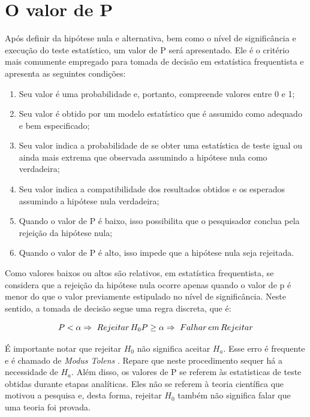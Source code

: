 \documentclass[
]{book}
\providecommand{\tightlist}{%
  \setlength{\itemsep}{0pt}\setlength{\parskip}{0pt}}
\begin{document}
\hypertarget{o-valor-de-p}{%
\section{O valor de P}\label{o-valor-de-p}}

Após definir da hipótese nula e alternativa, bem como o nível de significância e execução do teste estatístico, um valor de P será apresentado. Ele é o critério mais comumente empregado para tomada de decisão em estatística frequentista e apresenta as seguintes condições:

\begin{enumerate}
\def\labelenumi{(\arabic{enumi})}
\tightlist
\item
  Seu valor é uma probabilidade e, portanto, compreende valores entre 0 e 1;\\
\item
  Seu valor é obtido por um modelo estatístico que é assumido como adequado e bem especificado;\\
\item
  Seu valor indica a probabilidade de se obter uma estatística de teste igual ou ainda mais extrema que observada assumindo a hipótese nula como verdadeira;\\
\item
  Seu valor indica a compatibilidade dos resultados obtidos e os esperados assumindo a hipótese nula verdadeira;\\
\item
  Quando o valor de P é baixo, isso possibilita que o pesquisador conclua pela rejeição da hipótese nula;\\
\item
  Quando o valor de P é alto, isso impede que a hipótese nula seja rejeitada.
\end{enumerate}

Como valores baixos ou altos são relativos, em estatística frequentista, se considera que a rejeição da hipótese nula ocorre apenas quando o valor de p é menor do que o valor previamente estipulado no nível de significância. Neste sentido, a tomada de decisão segue uma regra discreta, que é:

\[P<\alpha \Rightarrow \ Rejeitar \, H_0 \\P    \geq \alpha \Rightarrow \ Falhar \,em \,Rejeitar \]

É importante notar que rejeitar \(H_0\) não significa aceitar \(H_a\). Esse erro é frequente e é chamado de \emph{Modus Tolens} \citep{Trafimow2019}. Repare que neste procedimento sequer há a necessidade de \(H_a\). Além disso, os valores de P se referem às estatisticas de teste obtidas durante etapas analíticas. Eles não se referem à teoria científica que motivou a pesquisa e, desta forma, rejeitar \(H_0\) também não significa falar que uma teoria foi provada.
\end{document}
